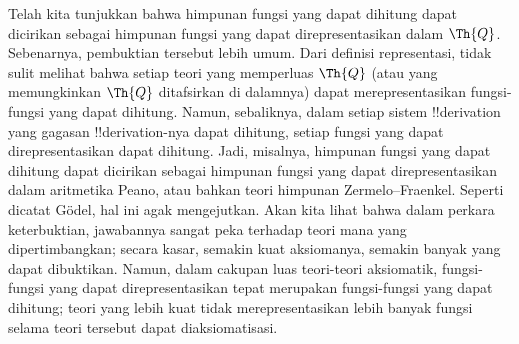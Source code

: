 \documentclass[../../../include/open-logic-section]{subfiles}
\begin{document}
\begin{explain}
Telah kita tunjukkan bahwa himpunan fungsi yang dapat dihitung dapat
dicirikan sebagai himpunan fungsi yang dapat direpresentasikan dalam
$\Th{Q}$. Sebenarnya, pembuktian tersebut lebih umum. Dari definisi
representasi, tidak sulit melihat bahwa setiap teori yang memperluas
$\Th{Q}$ (atau yang memungkinkan $\Th{Q}$ ditafsirkan di dalamnya) dapat
merepresentasikan fungsi-fungsi yang dapat dihitung. Namun, sebaliknya, dalam
setiap sistem !!{derivation} yang gagasan !!{derivation}-nya dapat dihitung,
setiap fungsi yang dapat direpresentasikan dapat dihitung. Jadi, misalnya,
himpunan fungsi yang dapat dihitung dapat dicirikan sebagai himpunan fungsi
yang dapat direpresentasikan dalam aritmetika Peano, atau bahkan teori
himpunan Zermelo--Fraenkel. Seperti dicatat G\"odel, hal ini agak
mengejutkan. Akan kita lihat bahwa dalam perkara keterbuktian, jawabannya
sangat peka terhadap teori mana yang dipertimbangkan; secara kasar, semakin
kuat aksiomanya, semakin banyak yang dapat dibuktikan. Namun, dalam cakupan
luas teori-teori aksiomatik, fungsi-fungsi yang dapat direpresentasikan tepat
merupakan fungsi-fungsi yang dapat dihitung; teori yang lebih kuat tidak
merepresentasikan lebih banyak fungsi selama teori tersebut dapat
diaksiomatisasi.
\end{explain}
\end{document}

